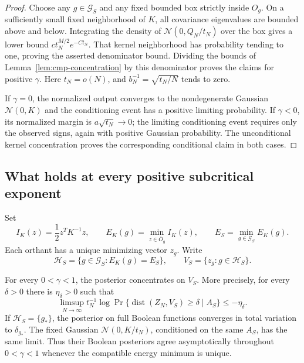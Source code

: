 \begin{proof}
Choose any $g\in\mathcal G_S$ and any fixed bounded box strictly inside
$O_g$. On a sufficiently small fixed neighborhood of $K$, all covariance
eigenvalues are bounded above and below. Integrating the density of
$\mathcal N(0,Q_N/t_N)$ over the box gives a lower bound
$c t_N^{M/2}e^{-Ct_N}$. That kernel neighborhood has probability tending
to one, proving the asserted denominator bound. Dividing the bounds of
Lemma~\ref{lem:cmp-concentration} by this denominator proves the claims
for positive $\gamma$. Here $t_N=o(N)$, and
$b_N^{-1}=\sqrt{t_N/N}$ tends to zero.

If $\gamma=0$, the normalized output converges to the nondegenerate
Gaussian $\mathcal N(0,K)$ and the conditioning event has a positive
limiting probability. If $\gamma<0$, its normalized margin is
$a\sqrt{t_N}\to0$; the limiting conditioning event requires only the
observed signs, again with positive Gaussian probability. The
unconditional kernel concentration proves the corresponding conditional
claim in both cases.
\end{proof}

\subsection{What holds at every positive subcritical exponent}

Set
\[
 I_K(z)=\frac12z^TK^{-1}z,\qquad
 E_K(g)=\min_{z\in\overline O_g}I_K(z),\qquad
 E_S=\min_{g\in\mathcal G_S}E_K(g).
\]
Each orthant has a unique minimizing vector $z_g$. Write
\[
 \mathcal H_S=\{g\in\mathcal G_S:E_K(g)=E_S\},\qquad
 V_S=\{z_g:g\in\mathcal H_S\}.
\]

\begin{proposition}
\label{prop:cmp-minimizers}
For every $0<\gamma<1$, the posterior concentrates on $V_S$. More
precisely, for every $\delta>0$ there is $\eta_\delta>0$ such that
\[
 \limsup_{N\to\infty}t_N^{-1}\log
 \Pr\{\operatorname{dist}(Z_N,V_S)\ge\delta\mid A_S\}
 \le-\eta_\delta.
\]
If $\mathcal H_S=\{g_*\}$, the posterior on full Boolean functions
converges in total variation to $\delta_{g_*}$. The fixed Gaussian
$\mathcal N(0,K/t_N)$, conditioned on the same $A_S$, has the same
limit. Thus their Boolean posteriors agree asymptotically throughout
$0<\gamma<1$ whenever the compatible energy minimum is unique.
\end{proposition}


